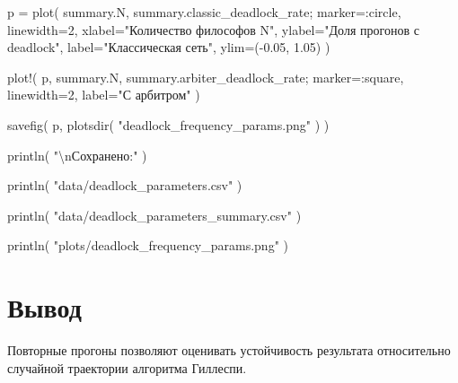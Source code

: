 \documentclass[
  english,
  russian,
  12pt,
  a4paper,
  DIV=11,
  numbers=noendperiod]{scrreprt}
\newenvironment{Shaded}{\begin{snugshade}}{\end{snugshade}}
\newcommand{\FloatTok}[1]{\textcolor[rgb]{0.68,0.00,0.00}{#1}}
\newcommand{\FunctionTok}[1]{\textcolor[rgb]{0.28,0.35,0.67}{#1}}
\newcommand{\NormalTok}[1]{\textcolor[rgb]{0.00,0.23,0.31}{#1}}
\newcommand{\OperatorTok}[1]{\textcolor[rgb]{0.37,0.37,0.37}{#1}}
\newcommand{\SpecialCharTok}[1]{\textcolor[rgb]{0.37,0.37,0.37}{#1}}
\newcommand{\StringTok}[1]{\textcolor[rgb]{0.13,0.47,0.30}{#1}}
\begin{document}
\begin{Shaded}
\begin{Highlighting}[]
\NormalTok{p }\OperatorTok{=}
    \FunctionTok{plot}\NormalTok{(}
\NormalTok{        summary.N,}
\NormalTok{        summary.classic\_deadlock\_rate;}
\NormalTok{        marker}\OperatorTok{=:}\NormalTok{circle,}
\NormalTok{        linewidth}\OperatorTok{=}\FloatTok{2}\NormalTok{,}
\NormalTok{        xlabel}\OperatorTok{=}\StringTok{"Количество философов N"}\NormalTok{,}
\NormalTok{        ylabel}\OperatorTok{=}\StringTok{"Доля прогонов с deadlock"}\NormalTok{,}
\NormalTok{        label}\OperatorTok{=}\StringTok{"Классическая сеть"}\NormalTok{,}
\NormalTok{        ylim}\OperatorTok{=}\NormalTok{(}\OperatorTok{{-}}\FloatTok{0.05}\NormalTok{, }\FloatTok{1.05}\NormalTok{)}
\NormalTok{    )}

\FunctionTok{plot!}\NormalTok{(}
\NormalTok{    p,}
\NormalTok{    summary.N,}
\NormalTok{    summary.arbiter\_deadlock\_rate;}
\NormalTok{    marker}\OperatorTok{=:}\NormalTok{square,}
\NormalTok{    linewidth}\OperatorTok{=}\FloatTok{2}\NormalTok{,}
\NormalTok{    label}\OperatorTok{=}\StringTok{"С арбитром"}
\NormalTok{)}

\FunctionTok{savefig}\NormalTok{(}
\NormalTok{    p,}
    \FunctionTok{plotsdir}\NormalTok{(}
        \StringTok{"deadlock\_frequency\_params.png"}
\NormalTok{    )}
\NormalTok{)}

\FunctionTok{println}\NormalTok{(}
    \StringTok{"}\SpecialCharTok{\textbackslash{}n}\StringTok{Сохранено:"}
\NormalTok{)}

\FunctionTok{println}\NormalTok{(}
    \StringTok{"data/deadlock\_parameters.csv"}
\NormalTok{)}

\FunctionTok{println}\NormalTok{(}
    \StringTok{"data/deadlock\_parameters\_summary.csv"}
\NormalTok{)}

\FunctionTok{println}\NormalTok{(}
    \StringTok{"plots/deadlock\_frequency\_params.png"}
\NormalTok{)}
\end{Highlighting}
\end{Shaded}

\section{Вывод}\label{ux432ux44bux432ux43eux434-1}

Повторные прогоны позволяют оценивать устойчивость результата
относительно случайной траектории алгоритма Гиллеспи.


\printbibliography
\end{document}
